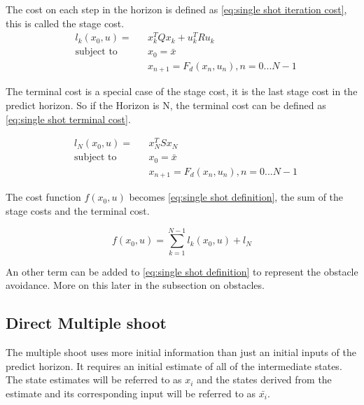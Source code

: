 			The cost on each step in the horizon is defined as \eqref{eq:single shot iteration cost}, this is called the stage cost.
			\begin{equation}
				\begin{aligned}
				& l_k(x_0,u) = &&  x_k^T Q x_k  +  u_k^T R u_k \\
				& \text{subject to}			&& x_0 = \bar{x} \\
				& 							&&  x_{n+1} = F_d(x_n,u_n), n=0...N-1
				\end{aligned}
				\label{eq:single shot iteration cost}
			\end{equation}
			
			The terminal cost is a special case of the stage cost, it is the last stage cost in the predict horizon. So if the Horizon is N, the terminal cost can be defined as \eqref{eq:single shot terminal cost}.
			
			\begin{equation}
				\begin{aligned}
					& l_N(x_0,u) = && x_N^TSx_N \\
					& \text{subject to}			&& x_0 = \bar{x} \\
					& 							&&  x_{n+1} = F_d(x_n,u_n), n=0...N-1
				\end{aligned}
				\label{eq:single shot terminal cost}
			\end{equation}
			
			The cost function $f(x_0,u)$ becomes \eqref{eq:single shot definition}, the sum of the stage costs and the terminal cost.
			
			\begin{equation}
				f(x_0,u) = \sum_{k=1}^{N-1} l_k(x_0,u) + l_N
				\label{eq:single shot definition}
			\end{equation}
			
			An other term can be added to \eqref{eq:single shot definition} to represent the obstacle avoidance. More on this later in the subsection on obstacles.
		\subsection{Direct Multiple shoot}
			The multiple shoot uses more initial information than just an initial inputs of the predict horizon. It requires an initial estimate of all of the intermediate states. The state estimates will be referred to as $x_i$ and the states derived from the estimate and its corresponding input will be referred to as $\bar{x_i}$. 
			
